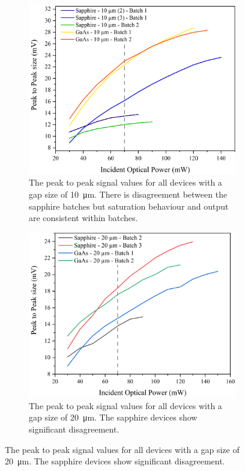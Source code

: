 \begin{figure}[ht]
\centering

\begin{subfigure}{0.49\textwidth}
\centering
\includegraphics[width=\textwidth]{Figures/Misc/SysDev/Opt10micronG.png}
\caption{The peak to peak signal values for all devices with a gap size of \SI{10}{\micro\metre}. There is disagreement between the sapphire batches but saturation behaviour and output are consistent within batches.}
\label{fig:10micron}
\end{subfigure}
\begin{subfigure}{0.49\textwidth}
\centering
\includegraphics[width=\textwidth]{Figures/Misc/SysDev/Opt20micronG.png}
\caption{The peak to peak signal values for all devices with a gap size of \SI{20}{\micro\metre}. The sapphire devices show significant disagreement.}
\label{fig:20micron}
\end{subfigure}


\end{figure}
